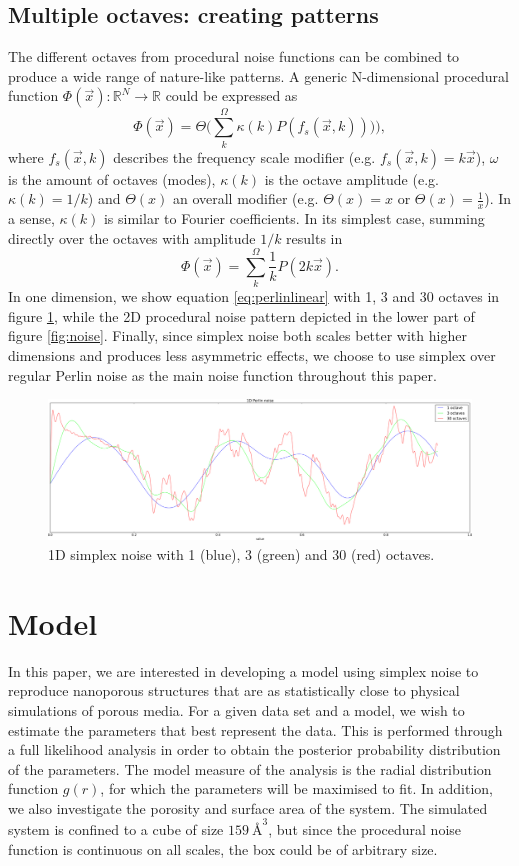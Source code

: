 \documentclass[aps,pre,twocolumn,letterpaper,floatfix,showpacs]{revtex4}
\begin{document}
\subsection{Multiple octaves: creating patterns}
\label{sec:octaves}
The different octaves from procedural noise functions can be combined
to produce a wide range of nature-like patterns. A generic
N-dimensional procedural function $\Phi(\vec x): \mathbb R^N \to
\mathbb R$ could be expressed as
\begin{equation}
\label{eq:procedural}
 \Phi(\vec x) = \Theta \Big(\sum_k^\Omega \kappa (k) P(  f_s (\vec x,k) )) \Big),
 \end{equation}
where $f_s(\vec x,k)$ describes the frequency scale modifier (e.g. $f_s(\vec x,k) =
k\vec x$), $\omega$ is the amount of octaves (modes), $\kappa(k)$ is the octave amplitude (e.g. $\kappa(k) = 1/k$)
and $\Theta(x)$ an overall modifier (e.g. $\Theta(x) = x$ or
$\Theta(x) = \frac{1}{x}$). In a sense, $\kappa(k)$ is similar to Fourier coefficients. 
In its simplest case, summing directly over the octaves with amplitude $1/k$ results in 
\begin{equation}
\label{eq:perlinlinear}
 \Phi(\vec x) = \sum_k^\Omega \frac{1}{k} P( 2k\vec x).
\end{equation}
In one dimension, we show equation \ref{eq:perlinlinear} with 1, 3 and 30 octaves in figure \ref{fig:1dperlin}, while the 2D procedural noise pattern depicted in the lower
part of figure \ref{fig:noise}. Finally, since simplex noise both scales better with higher dimensions and produces less asymmetric effects, we choose to use simplex over regular Perlin noise as the main noise function throughout this paper.

\begin{figure}
\includegraphics[width=.5\textwidth]{1d_perlin.png}
\caption{1D simplex noise with 1 (blue), 3 (green) and 30 (red) octaves. }
\label{fig:1dperlin}
\end{figure}


\section{Model}
In this paper, we are interested in developing a model using simplex noise to reproduce nanoporous structures that are as statistically close to physical simulations of porous media. For a given data set and a model, we wish to estimate the parameters that best represent the data. This is performed through a full likelihood analysis in order to obtain the posterior probability distribution of the parameters. The model measure of the analysis is the radial distribution function $g(r)$, for which the parameters will be maximised to fit. In addition, we also investigate the porosity and surface area of the system. The simulated system is confined to a cube of size $\SI{159} {\angstrom}^3$, but since the procedural noise function is continuous on all scales, the box could be of arbitrary size. 
\end{document}
